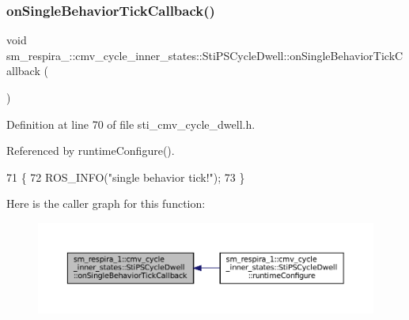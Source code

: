 \subsubsection{\texorpdfstring{on\+Single\+Behavior\+Tick\+Callback()}{onSingleBehaviorTickCallback()}}
{\footnotesize\ttfamily void sm\+\_\+respira\+\_\+::cmv\+\_\+cycle\+\_\+inner\+\_\+states\+::\+Sti\+P\+S\+Cycle\+Dwell\+::on\+Single\+Behavior\+Tick\+Callback (\begin{DoxyParamCaption}{ }\end{DoxyParamCaption})\hspace{0.3cm}{\ttfamily [inline]}}



Definition at line 70 of file sti\+\_\+cmv\+\_\+cycle\+\_\+dwell.\+h.



Referenced by runtime\+Configure().


\begin{DoxyCode}
71   \{
72     ROS\_INFO(\textcolor{stringliteral}{"single behavior tick!"});
73   \}
\end{DoxyCode}
Here is the caller graph for this function\+:
\nopagebreak
\begin{figure}[H]
\begin{center}
\leavevmode
\includegraphics[width=350pt]{structsm__respira__1_1_1cmv__cycle__inner__states_1_1StiPSCycleDwell_ae7223830d6879b3b7c35e072ed98b365_icgraph}
\end{center}
\end{figure}
\mbox{\label{structsm__respira__1_1_1cmv__cycle__inner__states_1_1StiPSCycleDwell_afe30abee5a61aa4c170db555ec7e2697}} 

